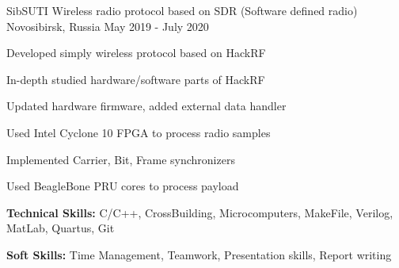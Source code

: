 

\begin{cventries}

  \cventry
    {SibSUTI} %
    {Wireless radio protocol based on SDR (Software defined radio)} %
    {Novosibirsk, Russia} %
    {May 2019 - July 2020} %
    {
      \begin{cvitems} %
        \item {Developed simply wireless protocol based on HackRF}
        \item {In-depth studied hardware/software parts of HackRF}
        \item {Updated hardware firmware, added external data handler}
        \item {Used Intel Cyclone 10 FPGA to process radio samples}
        \item {Implemented Carrier, Bit, Frame synchronizers}
        \item {Used BeagleBone PRU cores to process payload}
        \item {\textbf{Technical Skills:} C/C++, CrossBuilding, Microcomputers, MakeFile, Verilog, MatLab, Quartus, Git}
        \item {\textbf{Soft Skills:} Time Management, Teamwork, Presentation skills, Report writing}
      \end{cvitems}
    }


\end{cventries}
